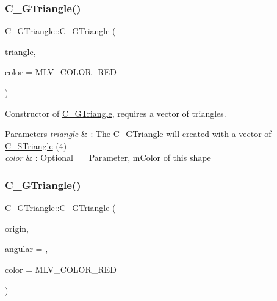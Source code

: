 \subsubsection{\texorpdfstring{C\+\_\+\+G\+Triangle()}{C\_GTriangle()}\hspace{0.1cm}{\footnotesize\ttfamily [5/6]}}
{\footnotesize\ttfamily C\+\_\+\+G\+Triangle\+::\+C\+\_\+\+G\+Triangle (\begin{DoxyParamCaption}\item[{const std\+::vector$<$ \hyperlink{classC__STriangle}{C\+\_\+\+S\+Triangle} $>$ \&}]{triangle,  }\item[{M\+L\+V\+\_\+\+Color}]{color = {\ttfamily MLV\+\_\+COLOR\+\_\+RED} }\end{DoxyParamCaption})\hspace{0.3cm}{\ttfamily [explicit]}}



Constructor of \hyperlink{classC__GTriangle}{C\+\_\+\+G\+Triangle}, requires a vector of triangles. 


\begin{DoxyParams}{Parameters}
{\em triangle} & \+: The \hyperlink{classC__GTriangle}{C\+\_\+\+G\+Triangle} will created with a vector of \hyperlink{classC__STriangle}{C\+\_\+\+S\+Triangle} (4) \\
\hline
{\em color} & \+: Optional \+\_\+\+\_\+\+Parameter, m\+Color of this shape \\
\hline
\end{DoxyParams}
\mbox{\label{classC__GTriangle_a2dc558251c2bd2591451e61f0d66714b}} 
\subsubsection{\texorpdfstring{C\+\_\+\+G\+Triangle()}{C\_GTriangle()}\hspace{0.1cm}{\footnotesize\ttfamily [6/6]}}
{\footnotesize\ttfamily C\+\_\+\+G\+Triangle\+::\+C\+\_\+\+G\+Triangle (\begin{DoxyParamCaption}\item[{const \hyperlink{classT__Point}{T\+\_\+\+Point}$<$ double $>$ \&}]{origin,  }\item[{double}]{angular = {},  }\item[{M\+L\+V\+\_\+\+Color}]{color = {\ttfamily MLV\+\_\+COLOR\+\_\+RED} }\end{DoxyParamCaption})\hspace{0.3cm}{\ttfamily [explicit]}}



